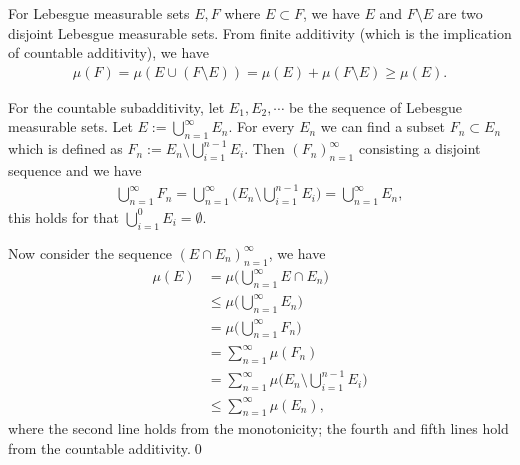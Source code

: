 \documentclass{book}
\theoremstyle{defstyle}
\theoremstyle{thmstyle}
\begin{document}
For Lebesgue measurable sets $E, F$ where $E \subset F$, we have $E$ and $F \setminus E$ are two disjoint Lebesgue measurable sets. From finite additivity (which is the implication of countable additivity), we have
    \begin{align*}
        \mu(F)
        = \mu(E \cup (F \setminus E))
        = \mu(E) + \mu(F \setminus E)
        \geq \mu(E).
    \end{align*}

For the countable subadditivity, let $E_1, E_2, \cdots$ be the sequence of Lebesgue measurable sets. Let $E := \bigcup_{n = 1}^{\infty}E_n$. For every $E_n$ we can find a subset $F_n \subset E_n$ which is defined as $F_n := E_n \setminus \bigcup_{i = 1}^{n - 1}E_i$. Then $(F_n)_{n = 1}^{\infty}$ consisting a disjoint sequence and we have
    \begin{align*}
        \bigcup_{n = 1}^{\infty}F_n
        = \bigcup_{n = 1}^{\infty}\Big(E_n \setminus \bigcup_{i = 1}^{n - 1}E_i\Big)
        = \bigcup_{n = 1}^{\infty}E_n,
    \end{align*}
this holds for that $\bigcup_{i = 1}^{0} E_i = \emptyset$.

Now consider the sequence $(E \cap E_n)_{n = 1}^{\infty}$, we have
    \begin{align*}
        \mu(E)
        &= \mu\Big(\bigcup_{n = 1}^{\infty}E \cap E_n\Big)\\
        &\leq \mu\Big(\bigcup_{n = 1}^{\infty}E_n\Big)\\
        &= \mu\Big(\bigcup_{n = 1}^{\infty}F_n\Big)\\
        &= \sum_{n = 1}^{\infty}\mu(F_n)\\
        &= \sum_{n = 1}^{\infty}\mu\Big(E_n \setminus \bigcup_{i = 1}^{n - 1}E_i\Big)\\
        &\leq \sum_{n = 1}^{\infty}\mu(E_n),
    \end{align*}
where the second line holds from the monotonicity; the fourth and fifth lines hold from the countable additivity.\qed
\end{document}
